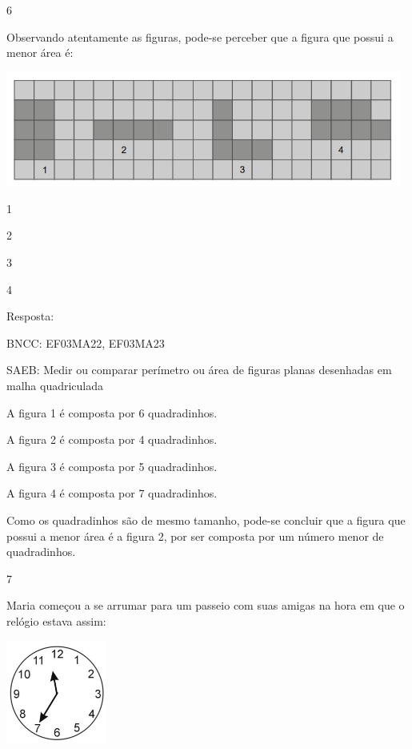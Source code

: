 \begin{escolha}
{\begin{escolha}
{\num{6}

Observando atentamente as figuras, pode-se perceber que a figura que possui a menor área é:


\includegraphics[width=5.12179in,height=1.48342in]{media/image133.png}

\begin{escolha}

\item
  1
\item
  2
\item
  3
\item
  4
\end{escolha}

Resposta:

BNCC: EF03MA22, EF03MA23

SAEB: Medir ou comparar perímetro ou área de figuras planas desenhadas em malha quadriculada

A figura 1 é composta por 6 quadradinhos.

A figura 2 é composta por 4 quadradinhos.

A figura 3 é composta por 5 quadradinhos.

A figura 4 é composta por 7 quadradinhos.

Como os quadradinhos são de mesmo tamanho, pode-se concluir que a figura
que possui a menor área é a figura 2, por ser composta por um número
menor de quadradinhos.

\num{7}

Maria começou a se arrumar para um passeio com suas amigas na hora em que o relógio estava assim:


\includegraphics[width=1.29487in,height=1.32633in]{media/image134.png}

}
\end{escolha}}
\end{escolha}
